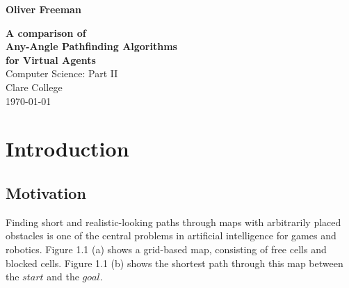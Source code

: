 \documentclass[12pt,notitlepage]{report}
\begin{document}


\pagestyle{empty}

\hfill{\LARGE \bf Oliver Freeman}

\vspace*{60mm}
\begin{center}
\Huge
{\bf A comparison of \\Any-Angle Pathfinding Algorithms \\for Virtual Agents} \\
\vspace*{5mm}
Computer Science: Part II \\
\vspace*{5mm}
Clare College \\
\vspace*{5mm}
\today  %
\end{center}

\cleardoublepage


\setcounter{page}{1}
\pagestyle{plain}



\cleardoublepage

\tableofcontents

\listoffigures

\listoftables

\listofalgorithms


\cleardoublepage        %

\setcounter{page}{1}
\pagestyle{headings}

\chapter{Introduction}

\section{Motivation}

Finding short and realistic-looking paths through maps with arbitrarily placed obstacles is one of the central problems in artificial intelligence for games and robotics. Figure 1.1 (a) shows a grid-based map, consisting of free cells and blocked cells. Figure 1.1 (b) shows the shortest path through this map between the $start$ and the $goal$.\\
\end{document}
